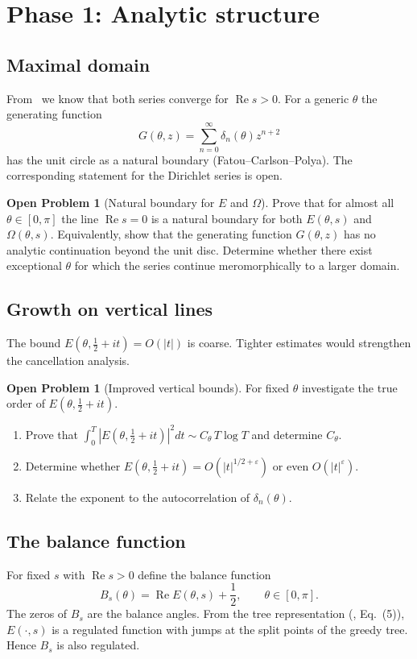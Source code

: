 \documentclass[11pt,a4paper]{article}
\theoremstyle{definition}
\newtheorem{problem}[theorem]{Open Problem}
\theoremstyle{remark}
\begin{document}
\section{Phase 1: Analytic structure}
\subsection{Maximal domain}
From~\cite{GDSTfound} we know that both series converge for \(\operatorname{Re}s>0\).  For a generic \(\theta\) the generating function
\[
G(\theta,z)=\sum_{n=0}^{\infty}\delta_n(\theta)z^{n+2}
\]
has the unit circle as a natural boundary (Fatou--Carlson--Polya).
The corresponding statement for the Dirichlet series is open.

\begin{problem}[Natural boundary for \(E\) and \(\Omega\)]\label{prob:natural}
Prove that for almost all \(\theta\in[0,\pi]\) the line \(\operatorname{Re}s=0\) is a natural boundary for both \(E(\theta,s)\) and \(\Omega(\theta,s)\).
Equivalently, show that the generating function \(G(\theta,z)\) has no analytic continuation beyond the unit disc.
Determine whether there exist exceptional \(\theta\) for which the series continue meromorphically to a larger domain.
\end{problem}

\subsection{Growth on vertical lines}
The bound \(E(\theta,\frac12+it)=O(|t|)\) is coarse.  Tighter estimates would strengthen the cancellation analysis.

\begin{problem}[Improved vertical bounds]\label{prob:growth}
For fixed \(\theta\) investigate the true order of \(E(\theta,\frac12+it)\).
\begin{enumerate}[label=(\alph*)]
\item Prove that \(\int_0^T|E(\theta,\frac12+it)|^2dt \sim C_\theta\,T\log T\) and determine \(C_\theta\).
\item Determine whether \(E(\theta,\frac12+it)=O(|t|^{1/2+\varepsilon})\) or even \(O(|t|^{\varepsilon})\).
\item Relate the exponent to the autocorrelation of \(\delta_n(\theta)\).
\end{enumerate}
\end{problem}

\subsection{The balance function}
For fixed \(s\) with \(\operatorname{Re}s>0\) define the balance function
\[
B_s(\theta)=\operatorname{Re}E(\theta,s)+\frac12,\qquad \theta\in[0,\pi].
\]
The zeros of \(B_s\) are the balance angles.  From the tree representation (\cite{GDSTfound}, Eq.~(5)), \(E(\cdot,s)\) is a regulated function with jumps at the split points of the greedy tree.  Hence \(B_s\) is also regulated.
\end{document}

